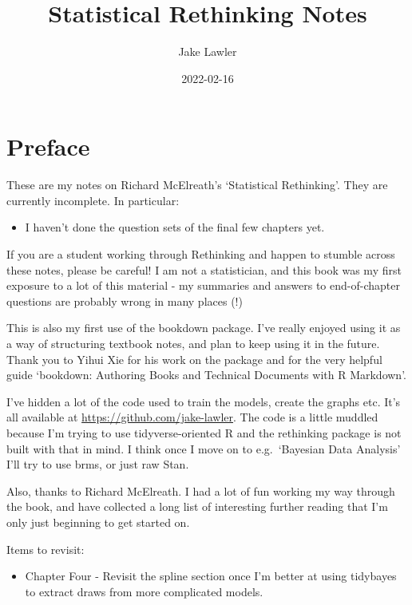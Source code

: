 \documentclass[
]{book}
\title{Statistical Rethinking Notes}
\author{Jake Lawler}
\date{2022-02-16}
\providecommand{\tightlist}{%
  \setlength{\itemsep}{0pt}\setlength{\parskip}{0pt}}
\begin{document}
\maketitle

{
\setcounter{tocdepth}{1}
\tableofcontents
}
\hypertarget{preface}{%
\chapter*{Preface}\label{preface}}

These are my notes on Richard McElreath's `Statistical Rethinking'. They are currently incomplete. In particular:

\begin{itemize}
\tightlist
\item
  I haven't done the question sets of the final few chapters yet.
\end{itemize}

If you are a student working through Rethinking and happen to stumble across these notes, please be careful! I am not a statistician, and this book was my first exposure to a lot of this material - my summaries and answers to end-of-chapter questions are probably wrong in many places (!)

This is also my first use of the bookdown package. I've really enjoyed using it as a way of structuring textbook notes, and plan to keep using it in the future. Thank you to Yihui Xie for his work on the package and for the very helpful guide `bookdown: Authoring Books and Technical Documents with R Markdown'.

I've hidden a lot of the code used to train the models, create the graphs etc. It's all available at \url{https://github.com/jake-lawler}. The code is a little muddled because I'm trying to use tidyverse-oriented R and the rethinking package is not built with that in mind. I think once I move on to e.g.~`Bayesian Data Analysis' I'll try to use brms, or just raw Stan.

Also, thanks to Richard McElreath. I had a lot of fun working my way through the book, and have collected a long list of interesting further reading that I'm only just beginning to get started on.

Items to revisit:

\begin{itemize}
\tightlist
\item
  Chapter Four - Revisit the spline section once I'm better at using tidybayes to extract draws from more complicated models.
\end{itemize}
\end{document}
